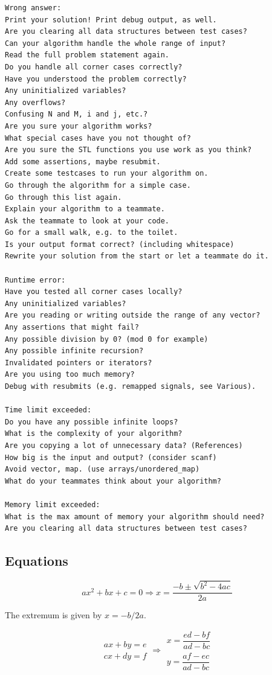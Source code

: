 \begin{multicols}{\Columns}
\begin{lstlisting}[language=raw]
Wrong answer:
Print your solution! Print debug output, as well.
Are you clearing all data structures between test cases?
Can your algorithm handle the whole range of input?
Read the full problem statement again.
Do you handle all corner cases correctly?
Have you understood the problem correctly?
Any uninitialized variables?
Any overflows?
Confusing N and M, i and j, etc.?
Are you sure your algorithm works?
What special cases have you not thought of?
Are you sure the STL functions you use work as you think?
Add some assertions, maybe resubmit.
Create some testcases to run your algorithm on.
Go through the algorithm for a simple case.
Go through this list again.
Explain your algorithm to a teammate.
Ask the teammate to look at your code.
Go for a small walk, e.g. to the toilet.
Is your output format correct? (including whitespace)
Rewrite your solution from the start or let a teammate do it.

Runtime error:
Have you tested all corner cases locally?
Any uninitialized variables?
Are you reading or writing outside the range of any vector?
Any assertions that might fail?
Any possible division by 0? (mod 0 for example)
Any possible infinite recursion?
Invalidated pointers or iterators?
Are you using too much memory?
Debug with resubmits (e.g. remapped signals, see Various).

Time limit exceeded:
Do you have any possible infinite loops?
What is the complexity of your algorithm?
Are you copying a lot of unnecessary data? (References)
How big is the input and output? (consider scanf)
Avoid vector, map. (use arrays/unordered_map)
What do your teammates think about your algorithm?

Memory limit exceeded:
What is the max amount of memory your algorithm should need?
Are you clearing all data structures between test cases?
\end{lstlisting}





\subsection{Equations}
\[ax^2+bx+c=0 \Rightarrow x = \frac{-b\pm\sqrt{b^2-4ac}}{2a}\]

The extremum is given by $x = -b/2a$.

\[\begin{aligned}ax+by=e\\cx+dy=f\end{aligned}
\Rightarrow
\begin{aligned}x=\dfrac{ed-bf}{ad-bc}\\y=\dfrac{af-ec}{ad-bc}\end{aligned}\]


\end{multicols}
